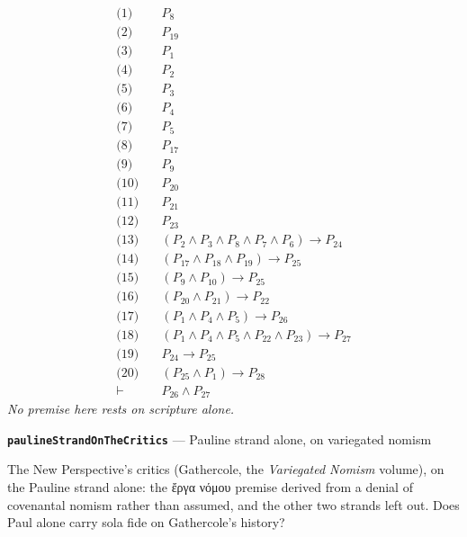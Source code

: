 \documentclass[11pt]{article}
\begin{document}
\begin{align*}
  \text{(1)} \quad & P_{8} \\
  \text{(2)} \quad & P_{19} \\
  \text{(3)} \quad & P_{1} \\
  \text{(4)} \quad & P_{2} \\
  \text{(5)} \quad & P_{3} \\
  \text{(6)} \quad & P_{4} \\
  \text{(7)} \quad & P_{5} \\
  \text{(8)} \quad & P_{17} \\
  \text{(9)} \quad & P_{9} \\
  \text{(10)} \quad & P_{20} \\
  \text{(11)} \quad & P_{21} \\
  \text{(12)} \quad & P_{23} \\
  \text{(13)} \quad & (P_{2} \land P_{3} \land P_{8} \land P_{7} \land P_{6}) \rightarrow P_{24} \\
  \text{(14)} \quad & (P_{17} \land P_{18} \land P_{19}) \rightarrow P_{25} \\
  \text{(15)} \quad & (P_{9} \land P_{10}) \rightarrow P_{25} \\
  \text{(16)} \quad & (P_{20} \land P_{21}) \rightarrow P_{22} \\
  \text{(17)} \quad & (P_{1} \land P_{4} \land P_{5}) \rightarrow P_{26} \\
  \text{(18)} \quad & (P_{1} \land P_{4} \land P_{5} \land P_{22} \land P_{23}) \rightarrow P_{27} \\
  \text{(19)} \quad & P_{24} \rightarrow P_{25} \\
  \text{(20)} \quad & (P_{25} \land P_{1}) \rightarrow P_{28} \\
  \vdash \quad & P_{26} \land P_{27}
\end{align*}
\emph{No premise here rests on scripture alone.}
\par\medskip\noindent\textbf{\texttt{pauline\allowbreak{}Strand\allowbreak{}On\allowbreak{}The\allowbreak{}Critics}} --- Pauline strand alone, on variegated nomism\par\nobreak\noindent
The New Perspective's critics (Gathercole, the \emph{Variegated Nomism} volume), on the Pauline strand alone: the ἔργα νόμου premise derived from a denial of covenantal nomism rather than assumed, and the other two strands left out. Does Paul alone carry sola fide on Gathercole's history?
\end{document}
